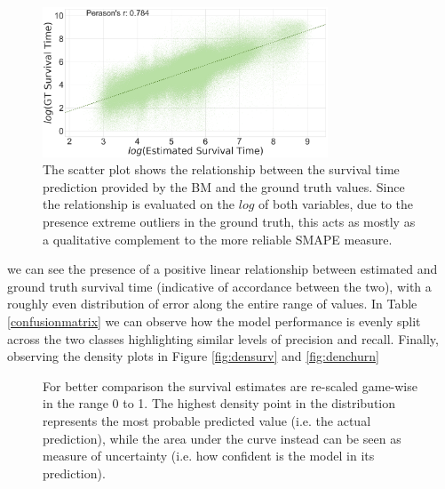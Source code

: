 \begin{figure}[h]
  \centering
  \includegraphics[width=8.5cm]{images/chapter_3/performance_survival_31.pdf}
  \caption[\textbf{Performance of the BM on survival task}]{The scatter plot shows the relationship between the survival time prediction provided by the BM and the ground truth values. Since the relationship is evaluated on the $log$ of both variables, due to the presence extreme outliers in the ground truth, this acts as mostly as a qualitative complement to the more reliable SMAPE measure.}
  \label{perfsurv}
\end{figure}
we can see the presence of a positive linear relationship between estimated and ground truth survival time (indicative of accordance between the two), with a roughly even distribution of error along the entire range of values. In Table \ref{confusionmatrix}  
we can observe how the model performance is evenly split across the two classes highlighting similar levels of precision and recall. Finally, observing the density plots in Figure \ref{fig:densurv} and \ref{fig:denchurn}
\begin{figure}[h]
  \centering
  \hfill
  \caption[\textbf{Distribution of the BM predictions for six random users, one for each game}]{For better comparison the survival estimates are re-scaled game-wise in the range 0 to 1. The highest density point in the distribution represents the most probable predicted value (i.e. the actual prediction),  while the area under the curve instead can be seen as measure of uncertainty (i.e. how confident is the model in its prediction).}
  \label{distestimations}
\end{figure}
